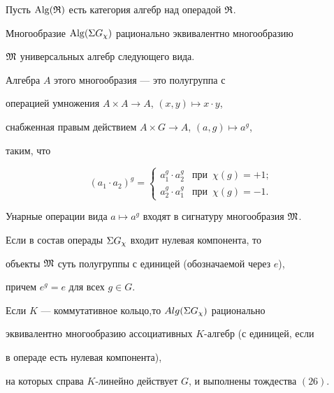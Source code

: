 Пусть $\operatorname{Alg}({\frak R})$ есть категория алгебр над операдой ${\frak R}$.








\begin{thm}


Многообразие $\operatorname{Alg}(\Sigma G_{\chi})$ рационально эквивалентно многообразию


${\frak M}$ универсальных алгебр следующего вида.


Алгебра $A$ этого многообразия --- это полугруппа с


операцией умножения $A \times A \rightarrow A$, $(x,y) \mapsto x\cdot y$,


снабженная правым действием $A \times G \rightarrow A$, $(a,g)\mapsto a^g$,


таким, что


\begin{equation}


(a_1 \cdot a_2)^g=


\begin{cases}


a_1^g \cdot a_2^g & \text{при} \ \; \chi(g)=+1; \\


a_2^g \cdot a_1^g & \text{при} \ \; \chi(g)=-1.


\end{cases}


\end{equation}


Унарные операции вида $ a \mapsto a^g$ входят в сигнатуру многообразия ${\frak M}$.


Если в состав операды $\Sigma G_{\chi}$ входит нулевая компонента, то


объекты ${\frak M}$ суть полугруппы с единицей (обозначаемой через $e$),


причем $e^g=e$ для всех $g \in G$.


Если $K$ --- коммутативное кольцо,то $Alg(\Sigma G_{\chi})$ рационально 


эквивалентно многообразию ассоциативных $K$-алгебр (с единицей, если 


в операде есть нулевая компонента),


на которых справа $K$-линейно действует $G$, и выполнены тождества $(26)$.


\end{thm}





